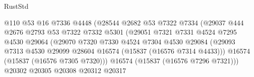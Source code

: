 \begin{lexlean}{RustStd}
\begin{coremodule}
{\begin{coremodule}
{{{{{{{{{{{{{{{{{{{{{{{{{{{{{{{{{{{{{{{{{{{{{{{{{{{{{{{{{{{{                                          @110
                                          @53
                                          @16
                                          @7336
                                          @4448
                                          (@28544
                                            @2682
                                            @53
                                            @7322
                                            @7334
                                            (@29037
                                              @444
                                              @2676
                                              @2793
                                              @53
                                              @7322
                                              @7332
                                              @5301
                                              (@29051
                                                @7321
                                                @7331
                                                @4524
                                                @7295
                                                @4530
                                                @29064
                                                (@29070
                                                  @7320
                                                  @7330
                                                  @4524
                                                  @7304
                                                  @4530
                                                  @29084
                                                  (@29093
                                                    @7313
                                                    @4530
                                                    @29099
                                                    @28604
                                                    @16574
                                                    (@15837 (@16576 @7314 @4433)))
                                                  @16574
                                                  (@15837 (@16576 @7305 @7320)))
                                                @16574
                                                (@15837 (@16576 @7296 @7321)))
                                              @20302
                                              @20305
                                              @20308
                                              @20312
                                              @20317
}}}}}}}}}}}}}}}}}}}}}}}}}}}}}}}}}}}}}}}}}}}}}}}}}}}}}}}}}}}}
\end{coremodule}}
\end{coremodule}
\end{lexlean}
